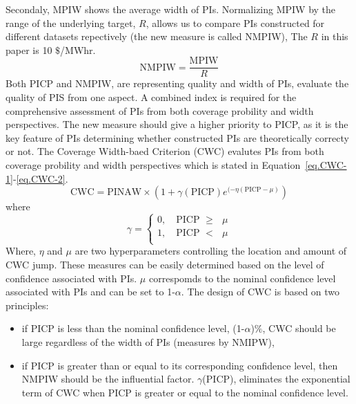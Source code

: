 \documentclass[review]{elsarticle}
\begin{document}
        Secondaly, MPIW shows the average width of PIs.
        Normalizing MPIW by the range of the underlying target, $R$, allows us to compare PIs constructed for different datasets repectively (the new measure is called NMPIW),
        The $R$ in this paper is 10 $\$$/MWhr.
        \begin{equation}
          \text{NMPIW} = \frac{\text{MPIW}}{R}
          \label{eq.NMPIW}
        \end{equation}
        Both PICP and NMPIW, are representing quality and width of PIs, evaluate the quality of PIS from one aspect.
        A combined index is required for the comprehensive assessment of PIs from both coverage probility and width perspectives.
        The new measure should give a higher priority to PICP, as it is the key feature of PIs determining whether constructed PIs are theoretically correcty or not.
        The Coverage Width-baed Criterion (CWC) evalutes PIs from both coverage probility and width perspectives which is stated in Equation~\ref{eq.CWC-1}-\ref{eq.CWC-2}.
        \begin{equation}
          \text{CWC}=\text{PINAW} \times (1+\gamma(\text{PICP})e^{(-\eta(\text{PICP}-\mu)})
          \label{eq.CWC-1}
        \end{equation}
        where
        \begin{equation}
          \gamma =
                \begin{cases}
                  0, \quad \text{PICP $\geq$ $\mu$} \\
                  1, \quad \text{PICP $<$ $\mu$} \\
                \end{cases}
          \label{eq.CWC-2}
        \end{equation}
        Where, $\eta$ and $\mu$ are two hyperparameters controlling the location and amount of CWC jump.
        These measures can be easily determined based on the level of confidence associated with PIs.
        $\mu$ correspomds to the nominal confidence level associated with PIs and can be set to 1-$\alpha$.
        The design of CWC is based on two principles:

        \begin{itemize}
          \item if PICP is less than the nominal confidence level, (1-$\alpha$)$\%$, CWC should be large regardless of the width of PIs (measures by NMIPW),
          \item if PICP is greater than or equal to its corresponding confidence level, then NMPIW should be the influential factor.
          $\gamma$(PICP), eliminates the exponential term of CWC when PICP is greater or equal to the nominal confidence level.
        \end{itemize}
\end{document}
